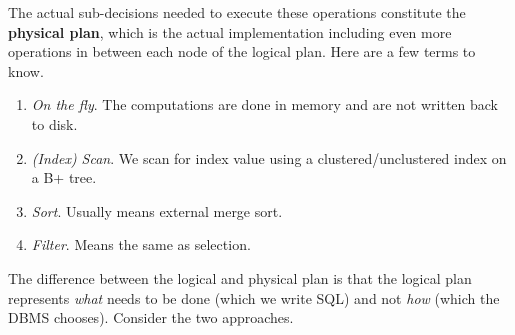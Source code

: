     \begin{definition}
      The actual sub-decisions needed to execute these operations constitute the \textbf{physical plan}, which is the actual implementation including even more operations in between each node of the logical plan. Here are a few terms to know. 
      \begin{enumerate}
        \item \textit{On the fly}. The computations are done in memory and are not written back to disk. 
        \item \textit{(Index) Scan}. We scan for index value using a clustered/unclustered index on a B+ tree. 
        \item \textit{Sort}. Usually means external merge sort. 
        \item \textit{Filter}. Means the same as selection. 
      \end{enumerate}
    \end{definition}

    The difference between the logical and physical plan is that the logical plan represents \textit{what} needs to be done (which we write SQL) and not \textit{how} (which the DBMS chooses). Consider the two approaches. 

